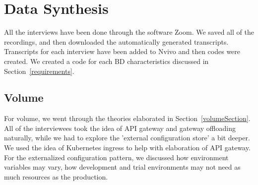 \documentclass[a4paper,11pt,article,oneside]{memoir}
\begin{document}
      

\section{Data Synthesis}

All the interviews have been done through the software Zoom. We saved all of the recordings, and then downloaded the automatically generated transcripts. Transcripts for each interview have been added to Nvivo and then codes were created. We created a code for each BD characteristics discussed in Section~\ref{requirements}. 


\subsection{Volume}

For volume, we went through the theories elaborated in Section~\ref{volumeSection}. All of the interviewees took the idea of API gateway and gateway offloading naturally, while we had to explore the 'external configuration store' a bit deeper. We used the idea of Kubernetes ingress to help with elaboration of API gateway. For the externalized configuration pattern, we discussed how environment variables may vary, how development and trial environments may not need as much resources as the production.
\end{document}
